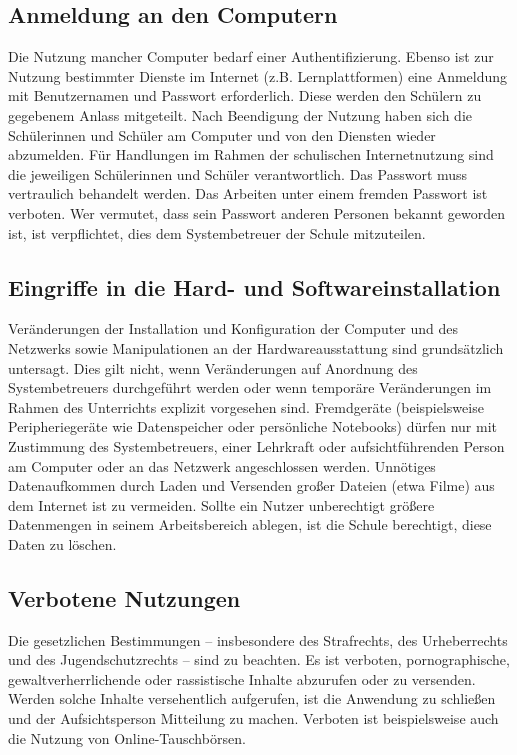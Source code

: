 \documentclass[a4paper, parskip]{scrartcl}
\begin{document}
\subsection{Anmeldung an den Computern}
Die Nutzung mancher Computer bedarf einer Authentifizierung. Ebenso ist zur
Nutzung bestimmter Dienste im Internet (z.B. Lernplattformen) eine Anmeldung
mit Benutzernamen und Passwort erforderlich. Diese werden den Schülern zu
gegebenem Anlass mitgeteilt. Nach Beendigung der Nutzung haben sich die
Schülerinnen und Schüler am Computer und von den Diensten wieder abzumelden.
Für Handlungen im Rahmen der schulischen Internetnutzung sind die jeweiligen
Schülerinnen und Schüler verantwortlich. Das Passwort muss vertraulich
behandelt werden. Das Arbeiten unter einem fremden Passwort ist verboten. Wer
vermutet, dass sein Passwort anderen Personen bekannt geworden ist, ist
verpflichtet, dies dem Systembetreuer der Schule mitzuteilen.
\subsection{Eingriffe in die Hard- und Softwareinstallation}
Veränderungen der Installation und Konfiguration der Computer und des Netzwerks
sowie Manipulationen an der Hardwareausstattung sind grundsätzlich untersagt.
Dies gilt nicht, wenn Veränderungen auf Anordnung des Systembetreuers
durchgeführt werden oder wenn temporäre Veränderungen im Rahmen des Unterrichts
explizit vorgesehen sind. Fremdgeräte (beispielsweise Peripheriegeräte wie
Datenspeicher oder persönliche Notebooks) dürfen nur mit Zustimmung des
Systembetreuers, einer Lehrkraft oder aufsichtführenden Person am Computer oder
an das Netzwerk angeschlossen werden. Unnötiges Datenaufkommen durch Laden und
Versenden großer Dateien (etwa Filme) aus dem Internet ist zu vermeiden. Sollte
ein Nutzer unberechtigt größere Datenmengen in seinem Arbeitsbereich ablegen,
ist die Schule berechtigt, diese Daten zu löschen.
\subsection{Verbotene Nutzungen}
Die gesetzlichen Bestimmungen – insbesondere des Strafrechts, des Urheberrechts
und des Jugendschutzrechts – sind zu beachten. Es ist verboten,
pornographische, gewaltverherrlichende oder rassistische Inhalte abzurufen oder
zu versenden. Werden solche Inhalte versehentlich aufgerufen, ist die Anwendung
zu schließen und der Aufsichtsperson Mitteilung zu machen. Verboten ist
beispielsweise auch die Nutzung von Online-Tauschbörsen.
\end{document}
